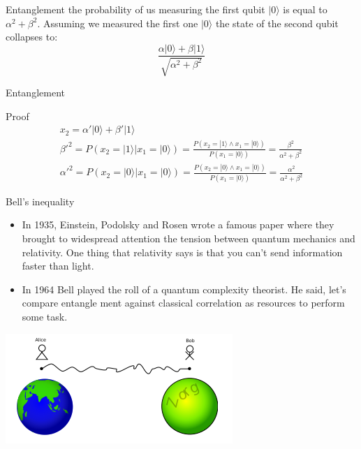     \begin{frame}{Entanglement}
        the probability of us measuring the first qubit $|0\rangle$ is equal to 
        $\alpha^2 + \beta^2$. Assuming we measured the first one $|0\rangle$ the state of the second qubit collapses to:
        $$\frac
        {\alpha |0\rangle + \beta |1\rangle}
        {\sqrt{\alpha^2 + \beta^2}}$$
    \end{frame}
    \begin{frame}{Entanglement}
        \begin{block}{Proof}
            \begin{gather}
                x_2 = \alpha' |0\rangle + \beta' |1\rangle\\
                \beta'^2 = P(x_2 = |1\rangle | x_1 = |0\rangle)=
                \frac
                {P(x_2 = |1\rangle \land x_1 = |0\rangle)}
                {P(x_1 = |0\rangle)}
                = \frac{\beta^2}{\alpha^2 + \beta^2} \\
                \alpha'^2 = P(x_2 = |0\rangle | x_1 = |0\rangle) =
                \frac
                {P(x_2 = |0\rangle \land x_1 = |0\rangle)}
                {P(x_1 = |0\rangle)}
                = \frac{\alpha^2}{\alpha^2 + \beta^2}
            \end{gather}
        \end{block}
    \end{frame}
    \begin{frame}{Bell's inequality}
        \begin{itemize}
            \item<1-> In 1935, Einstein, Podolsky and Rosen wrote a famous paper where they brought to widespread
            attention the tension between quantum mechanics and relativity. One thing that relativity says
            is that you can’t send information faster than light.
            \item<2-> In 1964 Bell played the roll of a quantum complexity theorist. He said, let’s compare entangle­ ment against classical correlation as resources to perform some task.
        \end{itemize}
        \begin{center}
            \includegraphics[scale=0.5]{images/ent.png}
        \end{center}
        
    \end{frame}

